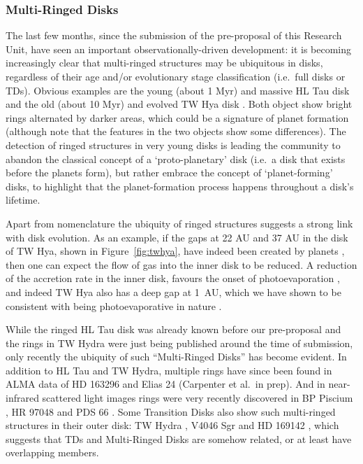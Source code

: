 \documentclass[10pt,fleqn,twoside,a4paper]{article}
\begin{document}
\subsubsection{Multi-Ringed Disks}
\label{sec-multi-ringed-disks}
The last few months, since the submission of the pre-proposal of this
Research Unit, have seen an important observationally-driven development: it
is becoming increasingly clear that multi-ringed structures may be
ubiquitous in disks, regardless of their age and/or evolutionary stage
classification (i.e.\ full disks or TDs). Obvious examples are the young
(about 1 Myr) and massive HL Tau disk \citep{2015ApJ...808L...3A} and the
old (about 10 Myr) and evolved TW Hya disk \citep{2016ApJ...820L..40A,
  2016arXiv161008939V}. Both object show bright rings alternated by darker
areas, which could be a signature of planet formation (although note that
the features in the two objects show some differences). The detection of
ringed structures in very young disks is leading the community to abandon
the classical concept of a `proto-planetary' disk (i.e.\ a disk that exists
before the planets form), but rather embrace the concept of `planet-forming'
disks, to highlight that the planet-formation process happens throughout a
disk's lifetime.

Apart from nomenclature the ubiquity of ringed structures suggests a strong
link with disk evolution. As an example, if the gaps at 22 AU and 37 AU in
the disk of TW Hya, shown in Figure~\ref{fig:twhya}, have indeed been
created by planets \citep[but see also][]{2016arXiv161008939V}, then one can
expect the flow of gas into the inner disk to be reduced. A reduction of the
accretion rate in the inner disk, favours the onset of photoevaporation
\citep[e.g.][]{2013MNRAS.430.1392R, 2015MNRAS.454.2173R}, and indeed TW Hya
also has a deep gap at 1~AU, which we have shown to be consistent with being
photoevaporative in nature \citep{2017MNRAS.464L..95E}.

While the ringed HL Tau disk was already known before our pre-proposal and
the rings in TW Hydra were just being published around the time of
submission, only recently the ubiquity of such ``Multi-Ringed Disks'' has
become evident. In addition to HL Tau and TW Hydra, multiple rings have
since been found in ALMA data of HD 163296 \citep{Isella2016} and Elias 24
(Carpenter et al.~in prep). And in near-infrared scattered light images
rings were very recently discovered in BP Piscium
\citep{2017MNRAS.466L...7D}, HR 97048 \citep{2016A&A...595A.112G} and PDS 66
\citep{2016ApJ...818L..15W}. Some Transition Disks also show such
multi-ringed structures in their outer disk: TW Hydra
\citep{2016arXiv161008939V}, V4046 Sgr \citep{2015ApJ...803L..10R} and HD
169142 \citep{2015PASJ...67...83M}, which suggests that TDs and Multi-Ringed
Disks are somehow related, or at least have overlapping members.
\end{document}
